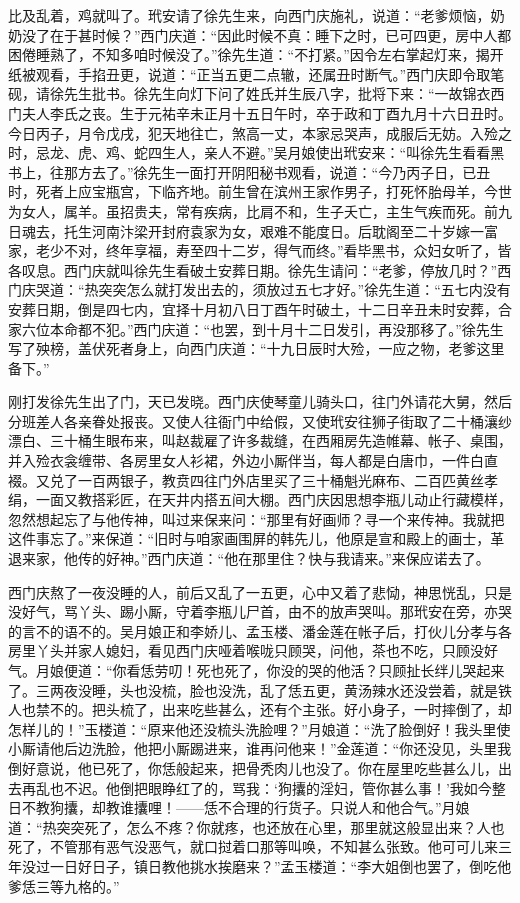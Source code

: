 比及乱着，鸡就叫了。玳安请了徐先生来，向西门庆施礼，说道：“老爹烦恼，奶奶没了在于甚时候？”西门庆道：“因此时候不真：睡下之时，已可四更，房中人都困倦睡熟了，不知多咱时候没了。”徐先生道：“不打紧。”因令左右掌起灯来，揭开纸被观看，手掐丑更，说道：“正当五更二点辙，还属丑时断气。”西门庆即令取笔砚，请徐先生批书。徐先生向灯下问了姓氏并生辰八字，批将下来：“一故锦衣西门夫人李氏之丧。生于元祐辛未正月十五日午时，卒于政和丁酉九月十六日丑时。今日丙子，月令戊戌，犯天地往亡，煞高一丈，本家忌哭声，成服后无妨。入殓之时，忌龙、虎、鸡、蛇四生人，亲人不避。”吴月娘使出玳安来：“叫徐先生看看黑书上，往那方去了。”徐先生一面打开阴阳秘书观看，说道：“今乃丙子日，已丑时，死者上应宝瓶宫，下临齐地。前生曾在滨州王家作男子，打死怀胎母羊，今世为女人，属羊。虽招贵夫，常有疾病，比肩不和，生子夭亡，主生气疾而死。前九日魂去，托生河南汴梁开封府袁家为女，艰难不能度日。后耽阁至二十岁嫁一富家，老少不对，终年享福，寿至四十二岁，得气而终。”看毕黑书，众妇女听了，皆各叹息。西门庆就叫徐先生看破土安葬日期。徐先生请问：“老爹，停放几时？”西门庆哭道：“热突突怎么就打发出去的，须放过五七才好。”徐先生道：“五七内没有安葬日期，倒是四七内，宜择十月初八日丁酉午时破土，十二日辛丑未时安葬，合家六位本命都不犯。”西门庆道：“也罢，到十月十二日发引，再没那移了。”徐先生写了殃榜，盖伏死者身上，向西门庆道：“十九日辰时大殓，一应之物，老爹这里备下。”

刚打发徐先生出了门，天已发晓。西门庆使琴童儿骑头口，往门外请花大舅，然后分班差人各亲眷处报丧。又使人往衙门中给假，又使玳安往狮子街取了二十桶瀼纱漂白、三十桶生眼布来，叫赵裁雇了许多裁缝，在西厢房先造帷幕、帐子、桌围，并入殓衣衾缠带、各房里女人衫裙，外边小厮伴当，每人都是白唐巾，一件白直裰。又兑了一百两银子，教贲四往门外店里买了三十桶魁光麻布、二百匹黄丝孝绢，一面又教搭彩匠，在天井内搭五间大棚。西门庆因思想李瓶儿动止行藏模样，忽然想起忘了与他传神，叫过来保来问：“那里有好画师？寻一个来传神。我就把这件事忘了。”来保道：“旧时与咱家画围屏的韩先儿，他原是宣和殿上的画士，革退来家，他传的好神。”西门庆道：“他在那里住？快与我请来。”来保应诺去了。

西门庆熬了一夜没睡的人，前后又乱了一五更，心中又着了悲恸，神思恍乱，只是没好气，骂丫头、踢小厮，守着李瓶儿尸首，由不的放声哭叫。那玳安在旁，亦哭的言不的语不的。吴月娘正和李娇儿、孟玉楼、潘金莲在帐子后，打伙儿分孝与各房里丫头并家人媳妇，看见西门庆哑着喉咙只顾哭，问他，茶也不吃，只顾没好气。月娘便道：“你看恁劳叨！死也死了，你没的哭的他活？只顾扯长绊儿哭起来了。三两夜没睡，头也没梳，脸也没洗，乱了恁五更，黄汤辣水还没尝着，就是铁人也禁不的。把头梳了，出来吃些甚么，还有个主张。好小身子，一时摔倒了，却怎样儿的！”玉楼道：“原来他还没梳头洗脸哩？”月娘道：“洗了脸倒好！我头里使小厮请他后边洗脸，他把小厮踢进来，谁再问他来！”金莲道：“你还没见，头里我倒好意说，他已死了，你恁般起来，把骨秃肉儿也没了。你在屋里吃些甚么儿，出去再乱也不迟。他倒把眼睁红了的，骂我：‘狗攮的淫妇，管你甚么事！’我如今整日不教狗攮，却教谁攮哩！——恁不合理的行货子。只说人和他合气。”月娘道：“热突突死了，怎么不疼？你就疼，也还放在心里，那里就这般显出来？人也死了，不管那有恶气没恶气，就口挝着口那等叫唤，不知甚么张致。他可可儿来三年没过一日好日子，镇日教他挑水挨磨来？”孟玉楼道：“李大姐倒也罢了，倒吃他爹恁三等九格的。”

